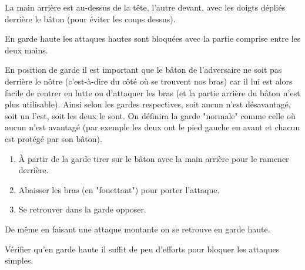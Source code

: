 \begin{garde}

La main arrière est au-dessus de la tête, l'autre devant, avec les doigts dépliés derrière le bâton (pour éviter les coups dessus).
\end{garde}


En garde haute les attaques hautes sont bloquées avec la partie comprise entre les deux mains.

En position de garde il est important que le bâton de l'adversaire ne soit pas derrière le nôtre (c'est-à-dire du côté où se trouvent nos bras) car il lui est alors facile de rentrer en lutte ou d'attaquer les bras (et la partie arrière du bâton n'est plus utilisable).
Ainsi selon les gardes respectives, soit aucun n'est désavantagé, soit un l'est, soit les deux le sont.
On définira la garde "normale" comme celle où aucun n'est avantagé (par exemple les deux ont le pied gauche en avant et chacun est protégé par son bâton).


\begin{exercice}


\begin{enumerate}
	\item À partir de la garde tirer sur le bâton avec la main arrière pour le ramener derrière.
	
	\item Abaisser les bras (en "fouettant") pour porter l'attaque.
	
	\item Se retrouver dans la garde opposer.
\end{enumerate}

De même en faisant une attaque montante on se retrouve en garde haute.
\end{exercice}


\begin{exercice}

Vérifier qu'en garde haute il suffit de peu d'efforts pour bloquer les attaques simples.
\end{exercice}
